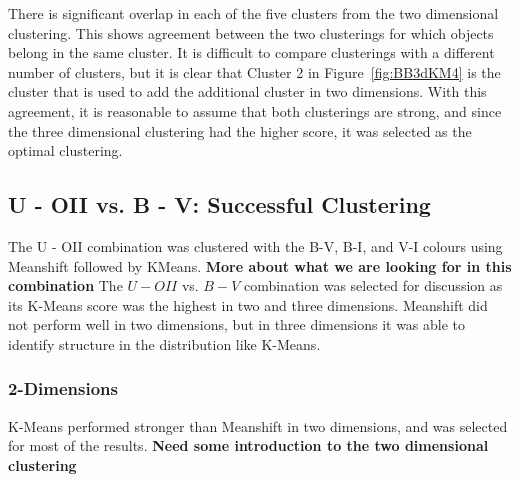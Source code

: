 There is significant overlap in each of the five clusters from the two dimensional clustering.
This shows agreement between the two clusterings for which objects belong in the same cluster. 
It is difficult to compare clusterings with a different number of clusters, but it is clear that Cluster 2 in Figure~\ref{fig:BB3dKM4} is the cluster that is used to add the additional cluster in two dimensions.
With this agreement, it is reasonable to assume that both clusterings are strong, and since the three dimensional clustering had the higher score, it was selected as the optimal clustering.
%
%
%
%
%
%
%
\subsection{U - OII vs. B - V: Successful Clustering}
The U - OII combination was clustered with the B-V, B-I, and V-I colours using Meanshift followed by KMeans. \textbf{More about what we are looking for in this combination}
The $U - OII$ vs. $B - V$ combination was selected for discussion as its K-Means score was the highest in two and three dimensions.
Meanshift did not perform well in two dimensions, but in three dimensions it was able to identify structure in the distribution like K-Means. 

\subsubsection{2-Dimensions}
K-Means performed stronger than Meanshift in two dimensions, and was selected for most of the results. \textbf{Need some introduction to the two dimensional clustering}

